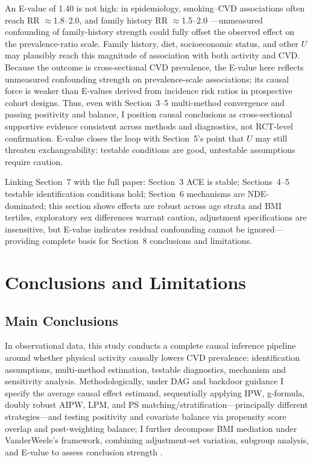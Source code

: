 \documentclass[12pt,a4paper]{article}
\begin{document}
An E-value of 1.40 is not high: in epidemiology, smoking--CVD associations often reach RR $\approx$1.8--2.0, and family history RR $\approx$1.5--2.0 \cite{mi2025creview,hernan2024whatif}---unmeasured confounding of family-history strength could fully offset the observed effect on the prevalence-ratio scale. Family history, diet, socioeconomic status, and other $U$ may plausibly reach this magnitude of association with both activity and CVD. Because the outcome is cross-sectional CVD prevalence, the E-value here reflects unmeasured confounding strength on prevalence-scale associations; its causal force is weaker than E-values derived from incidence risk ratios in prospective cohort designs. Thus, even with Section~3--5 multi-method convergence and passing positivity and balance, I position causal conclusions as cross-sectional supportive evidence consistent across methods and diagnostics, not RCT-level confirmation. E-value closes the loop with Section~5's point that $U$ may still threaten exchangeability: testable conditions are good, untestable assumptions require caution.

Linking Section~7 with the full paper: Section~3 ACE is stable; Sections~4--5 testable identification conditions hold; Section~6 mechanisms are NDE-dominated; this section shows effects are robust across age strata and BMI tertiles, exploratory sex differences warrant caution, adjustment specifications are insensitive, but E-value indicates residual confounding cannot be ignored---providing complete basis for Section~8 conclusions and limitations.

\section{Conclusions and Limitations}

\subsection{Main Conclusions}

In observational data, this study conducts a complete causal inference pipeline around whether physical activity causally lowers CVD prevalence: identification assumptions, multi-method estimation, testable diagnostics, mechanism and sensitivity analysis. Methodologically, under DAG and backdoor guidance I specify the average causal effect estimand, sequentially applying IPW, g-formula, doubly robust AIPW, LPM, and PS matching/stratification---principally different strategies---and testing positivity and covariate balance via propensity score overlap and post-weighting balance; I further decompose BMI mediation under VanderWeele's framework, combining adjustment-set variation, subgroup analysis, and E-value to assess conclusion strength \cite{hernan2024whatif,vanderweele2015explanation,vanderweele2017evalue}.
\end{document}
